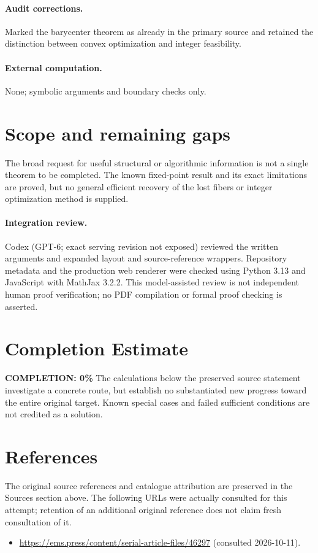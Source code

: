 \documentclass[11pt]{article}
\begin{document}
\paragraph{Audit corrections.} Marked the barycenter theorem as already in the primary source and retained the distinction between convex optimization and integer feasibility.
\paragraph{External computation.} None; symbolic arguments and boundary checks only.
\section{Scope and remaining gaps}
The broad request for useful structural or algorithmic information is not a single theorem to be completed. The known fixed-point result and its exact limitations are proved, but no general efficient recovery of the lost fibers or integer optimization method is supplied.
\paragraph{Integration review.} Codex (GPT-6; exact serving revision not exposed) reviewed the written arguments and expanded layout and source-reference wrappers. Repository metadata and the production web renderer were checked using Python 3.13 and JavaScript with MathJax 3.2.2. This model-assisted review is not independent human proof verification; no PDF compilation or formal proof checking is asserted.

\section{Completion Estimate}
\noindent\textbf{COMPLETION: 0\%}
The calculations below the preserved source statement investigate a concrete route,
but establish no substantiated new progress toward the entire original target.
Known special cases and failed sufficient conditions are not credited as a solution.
\section{References}
The original source references and catalogue attribution are preserved in the
Sources section above. The following URLs were actually consulted for this attempt;
retention of an additional original reference does not claim fresh consultation of it.
\begin{itemize}
\item \url{https://ems.press/content/serial-article-files/46297} (consulted 2026-10-11). 
\end{itemize}
\end{document}
